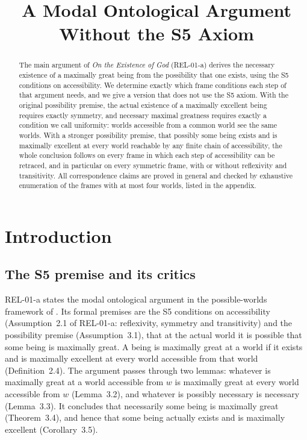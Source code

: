 \documentclass{situationist-preprint}
\title{A Modal Ontological Argument Without the S5 Axiom}
\begin{document}
\maketitle

\begin{abstract}
The main argument of \emph{On the Existence of God} (REL-01-a) derives the necessary existence of a maximally great being from the possibility that one exists, using the S5 conditions on accessibility. We determine exactly which frame conditions each step of that argument needs, and we give a version that does not use the S5 axiom. With the original possibility premise, the actual existence of a maximally excellent being requires exactly symmetry, and necessary maximal greatness requires exactly a condition we call uniformity: worlds accessible from a common world see the same worlds. With a stronger possibility premise, that possibly some being exists and is maximally excellent at every world reachable by any finite chain of accessibility, the whole conclusion follows on every frame in which each step of accessibility can be retraced, and in particular on every symmetric frame, with or without reflexivity and transitivity. All correspondence claims are proved in general and checked by exhaustive enumeration of the \stTotal{} frames with at most four worlds, listed in the appendix.
\end{abstract}

\section{Introduction}

\subsection{The S5 premise and its critics}

REL-01-a states the modal ontological argument in the possible-worlds framework of \citet{Plantinga1974}. Its formal premises are the S5 conditions on accessibility (Assumption~2.1 of REL-01-a: reflexivity, symmetry and transitivity) and the possibility premise (Assumption~3.1), that at the actual world it is possible that some being is maximally great. A being is maximally great at a world if it exists and is maximally excellent at every world accessible from that world (Definition~2.4). The argument passes through two lemmas: whatever is maximally great at a world accessible from $w$ is maximally great at every world accessible from $w$ (Lemma~3.2), and whatever is possibly necessary is necessary (Lemma~3.3). It concludes that necessarily some being is maximally great (Theorem~3.4), and hence that some being actually exists and is maximally excellent (Corollary~3.5).
\end{document}
